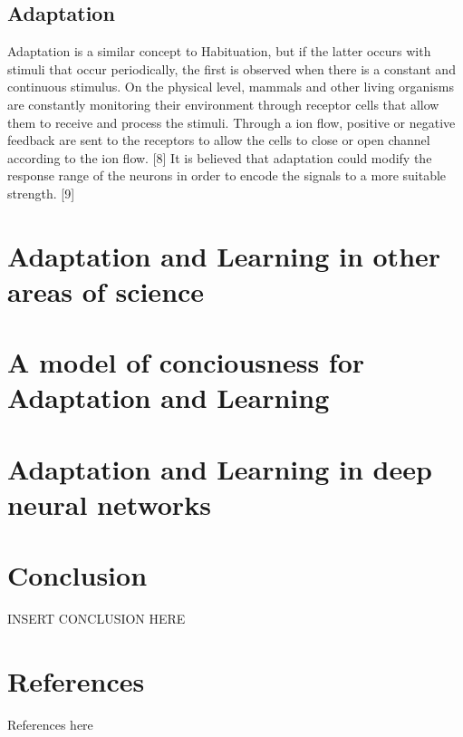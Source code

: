 \documentclass[conference]{IEEEtran}
\begin{document}
	\subsection{Adaptation}\label{AA}
		Adaptation is a similar concept to Habituation, but if the latter occurs with stimuli that occur periodically, the first is observed when there is a constant and continuous stimulus.
		On the physical level, mammals and other living organisms are constantly monitoring their environment through receptor cells that allow them to receive and process the stimuli. Through a ion flow, positive or negative feedback are sent to the receptors to allow the cells to close or open channel according to the ion flow. [8]
		It is believed that adaptation could modify the response range of the neurons in order to encode the signals to a more suitable strength. [9]

\section{Adaptation and Learning in other areas of science}

\section{A model of conciousness for Adaptation and Learning}

\section{Adaptation and Learning in deep neural networks}

\section{Conclusion}
	INSERT CONCLUSION HERE

\section*{References}
	References here
\end{document}
